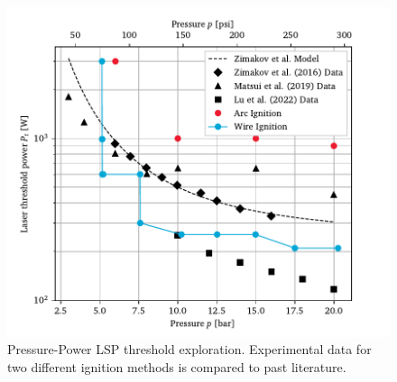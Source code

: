     \begin{figure}[h]
        \centering
        \includegraphics[]{assets/5 results/powerthreshold.pdf}
        \caption[Pressure-Power LSP threshold exploration]{Pressure-Power LSP threshold exploration. Experimental data for two different ignition methods is compared to past literature.}
        \label{fig:powerthreshold}
    \end{figure}